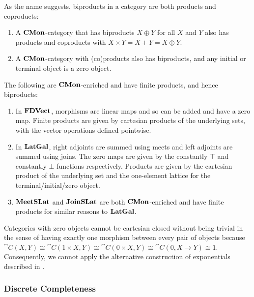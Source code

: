 As the name suggests, biproducts in a category are both products and
coproducts:
\begin{proposition}
  \item
  \begin{enumerate}
  \item A $\mathbf{CMon}$-category that has biproducts $X \oplus Y$ for all
    $X$ and $Y$ also has products and coproducts with
    $X \times Y = X + Y = X \oplus Y$.
  \item A $\mathbf{CMon}$-category with (co)products also has biproducts, and
    any initial or terminal object is a zero object.
  \end{enumerate}
\end{proposition}

\begin{example}
  The following are $\mathbf{CMon}$-enriched and have finite products, and
  hence biproducts:
  \begin{enumerate}
  \item In $\mathbf{FDVect}$, morphisms are linear maps and so can be added
    and have a zero map. Finite products are given by cartesian
    products of the underlying sets, with the vector operations
    defined pointwise.
  \item In $\mathbf{LatGal}$, right adjoints are summed using meets and left
    adjoints are summed using joins. The zero maps are given by the
    constantly $\top$ and constantly $\bot$ functions
    respectively. Products are given by the cartesian product of the
    underlying set and the one-element lattice for the
    terminal/initial/zero object.
  \item $\mathbf{MeetSLat}$ and $\mathbf{JoinSLat}$ are both $\mathbf{CMon}$-enriched and have
    finite products for similar reasons to $\mathbf{LatGal}$.
  \end{enumerate}
\end{example}

\begin{remark}
  Categories with zero objects cannot be cartesian closed without
  being trivial in the sense of having exactly one morphism between
  every pair of objects because
  $\cat{C}(X, Y) \cong \cat{C}(1 \times X,Y) \cong \cat{C}(0 \times
  X,Y) \cong \cat{C}(0,X \to Y) \cong 1$. Consequently, we cannot
  apply the alternative construction of exponentials described in
  .
\end{remark}

\subsubsection{Discrete Completeness}
\label{sec:fixing-completeness}

